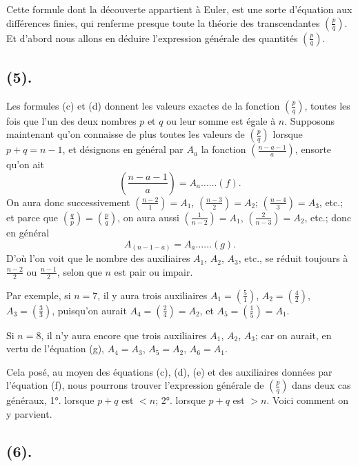 \documentclass{article}
\begin{document}
Cette formule dont la découverte appartient à Euler, est une sorte d'équation aux différences finies, qui renferme presque toute la théorie des transcendantes $\left(\frac{p}{q}\right)$. Et d'abord nous allons en déduire l'expression générale des quantités $\left(\frac{p}{q}\right)$.


\subsection*{(5).}

Les formules (c) et (d) donnent les valeurs exactes de la fonction $\left(\frac{p}{q}\right)$, toutes les fois que l'un des deux nombres $p$ et $q$ ou leur somme est égale à $n$. Supposons maintenant qu'on connaisse de plus toutes les valeurs de $\left(\frac{p}{q}\right)$ lorsque $p+q=n-1$, et désignons en général par $A_{a}$ la fonction $\left(\frac{n-a-1}{a}\right)$, ensorte qu'on ait
\[ \left(\frac{n-a-1}{a}\right)=A_{a}\ldots\ldots(f). \]
On aura donc successivement $\left(\frac{n-2}{1}\right)=A_{1}$, $\left(\frac{n-3}{2}\right)=A_{2}$; $\left(\frac{n-4}{3}\right)=A_{3}$, etc.; et parce que $\left(\frac{q}{p}\right)=\left(\frac{p}{q}\right)$, on aura aussi $\left(\frac{1}{n-2}\right)=A_{1}$, $\left(\frac{2}{n-3}\right)=A_{2}$, etc.; donc en général
\[ A_{(n-1-a)}=A_{a}\ldots\ldots(g). \]
D'où l'on voit que le nombre des auxiliaires $A_{1}$, $A_{2}$, $A_{3}$, etc., se réduit toujours à $\frac{n-2}{2}$ ou $\frac{n-1}{2}$, selon que $n$ est pair ou impair.

Par exemple, si $n=7$, il y aura trois auxiliaires $A_{1}=\left(\frac{5}{1}\right)$, $A_{2}=\left(\frac{4}{2}\right)$, $A_{3}=\left(\frac{3}{3}\right)$, puisqu'on aurait $A_{4}=\left(\frac{2}{4}\right)=A_{2}$, et $A_{5}=\left(\frac{1}{5}\right)=A_{1}$.

Si $n=8$, il n'y aura encore que trois auxiliaires $A_{1}$, $A_{2}$, $A_{3}$; car on aurait, en vertu de l'équation (g), $A_{4}=A_{3}$, $A_{5}=A_{2}$, $A_{6}=A_{1}$.

Cela posé, au moyen des équations (c), (d), (e) et des auxiliaires données par l'équation (f), nous pourrons trouver l'expression générale de $\left(\frac{p}{q}\right)$ dans deux cas généraux, 1°. lorsque $p+q$ est $<n$; 2°. lorsque $p+q$ est $>n$. Voici comment on y parvient.

\subsection*{(6).}
\end{document}
